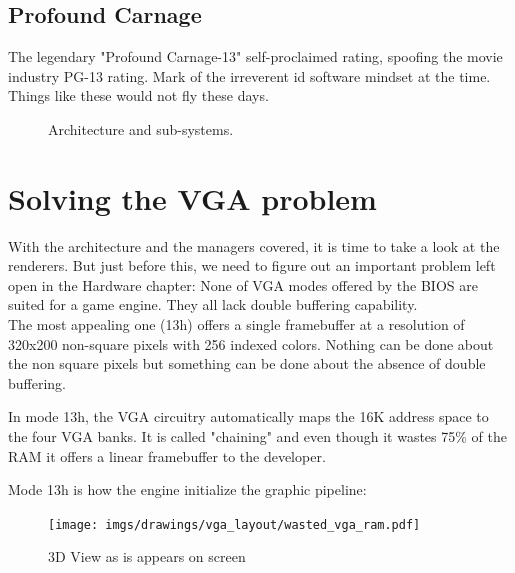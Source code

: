 \documentclass[book.tex]{subfiles}
\begin{document}
\subsection{Profound Carnage}
The legendary "Profound Carnage-13" self-proclaimed rating, spoofing the movie industry PG-13 rating. Mark of the irreverent id software mindset at the time. Things like these would not fly these days.
\begin{figure}[H]
\centering
{}
\caption{Architecture and sub-systems.}
\end{figure}





















\section{Solving the VGA problem}\label{SetupPages}
With the architecture and the managers covered, it is time to take a look at the renderers. But just before this, we need to figure out an important
problem left open in the Hardware chapter: None of VGA modes offered by the BIOS are suited for a game engine. They all lack double buffering capability.\\

 The most appealing one (13h) offers a single framebuffer at a resolution of 320x200 non-square pixels with 256 indexed colors. Nothing can be done about the non square pixels but something can be done about the absence of double buffering.\\
\par
 In mode 13h, the VGA circuitry automatically maps the 16K address space to the four VGA banks. It is called "chaining" and even though it wastes 75\% of the RAM it offers a linear framebuffer to the developer.\\
 \par
 Mode 13h is how the engine initialize the graphic pipeline:\\
\par

\begin{figure}[H]
\centering
 \texttt{[image: imgs/drawings/vga\_layout/wasted\_vga\_ram.pdf]}
 \caption{3D View as is appears on screen} \label{fig:vga_layout_in_3D}
 \end{figure}
\end{document}
